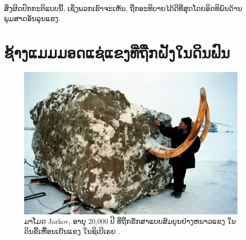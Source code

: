 \documentclass[10pt,twocolumn,letterpaper]{article}
\begin{document}
ສິ່ງຜິດປົກກະຕິແບບນີ້, ເຊິ່ງພວກເຮົາຈະເຫັນ, ຖືກອະທິບາຍໄດ້ດີທີ່ສຸດໂດຍອິດທິພົນດ້ານພູມສາດອັນລຸນແຮງ.

\section{ຊ້າງແມມມອດແຊ່ແຂງທີ່ຖືກຝັງໃນດິນຟົນ}

\begin{figure}[t]
\begin{center}
   \includegraphics[width=1\linewidth]{jarkov-mammoth.jpg}
\end{center}
   \caption{ມາໂມດ Jarkov, ອາຍຸ 20,000 ປີ ທີ່ຖືກຮັກສາແບບສົມບູນຢ່າງຫນາວແຂງ ໃນດິນຂີ້ເຫື້ອນເຢັນແຂງ ໃນຊິເບີເຣຍ \cite{51}.}
\label{fig:1}
\label{fig:onecol}
\end{figure}
\end{document}
